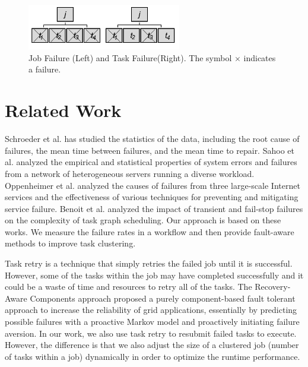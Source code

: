 \begin{figure}[h!]
	\centering
    \includegraphics[width=0.6\textwidth]{figures/tolerance/ftc_failure.pdf}
    \caption{Job Failure (Left) and Task Failure(Right). The symbol $\times$ indicates a failure.  }
    \label{fig:ftc_failure}
\end{figure}


\section{Related Work}

Schroeder et al. \cite{Schroeder2006} has studied the statistics of the data, including the root cause of failures, the mean time between failures, and the mean time to repair. Sahoo et al. \cite{Sahoo2004} analyzed the empirical and statistical properties of system errors and failures from a network of heterogeneous servers running a diverse workload. Oppenheimer et al. \cite{Oppenheimer2002} analyzed the causes of failures from three large-scale Internet services and the effectiveness of various techniques for preventing and mitigating service failure. 
Benoit \cite{Benoit2010} et al. analyzed the impact of transient and fail-stop failures on the complexity of task graph scheduling. Our approach is based on these works. We measure the failure rates in a workflow and then provide fault-aware methods to improve task clustering.  

Task retry is a technique that simply retries the failed job until it is successful. However, some of the tasks within the job may have completed successfully and it could be a waste of time and resources to retry all of the tasks. The Recovery-Aware Components approach \cite{Yusuf2009} proposed a purely component-based fault tolerant approach to increase the reliability of grid applications, essentially by predicting possible failures with a proactive Markov model and proactively initiating failure aversion. In our work, we also use task retry to resubmit failed tasks to execute. However, the difference is that we also adjust the size of a clustered job (number of tasks within a job) dynamically in order to optimize the runtime performance. 

